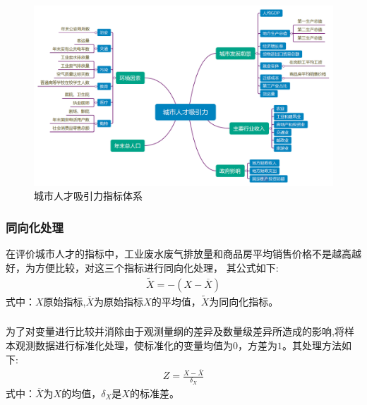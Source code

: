 \documentclass{whutmod}
\begin{document}
		\begin{figure}[H]
			\centering
			\includegraphics[width=\textwidth]{figures/clt.png}
			\caption{城市人才吸引力指标体系}\label{lct}
		\end{figure}  
		
		\subsubsection{同向化处理}

		在评价城市人才的指标中，工业废水废气排放量和商品房平均销售价格不是越高越好，为方便比较，对这三个指标进行同向化处理\cite{张瑞红2012河南省产业集群环境人才吸引力评价研究}， 其公式如下:
		\begin{gather}
		\widetilde{X}=-(X-\overline{X})
		\end{gather}
		式中：$X$原始指标,$\overline{X}$为原始指标$X$的平均值，$\widetilde{X}$为同向化指标。
		
		\subsubsection{}
		为了对变量进行比较并消除由于观测量纲的差异及数量级差异所造成的影响,将样本观测数据进行标准化处理，使标准化的变量均值为$0$，方差为$1$。其处理方法如下:
		\begin{gather}
		Z=\frac{X-\overline{X}}{\delta_{X}}
		\end{gather}
		式中：$\overline{X}$为$X$的均值，$\delta_{X}$是$X$的标准差。
		
\end{document}
